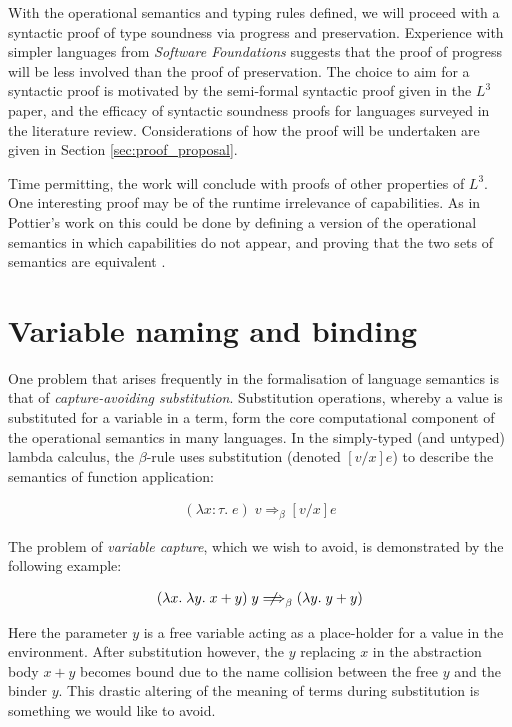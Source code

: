 \documentclass[]{unswthesis}
\newcommand{\SSPHS}{\text{SSPHS }}
\begin{document}
With the operational semantics and typing rules defined, we will proceed with a syntactic proof of type soundness via progress and preservation. Experience with simpler languages from \textit{Software Foundations} \cite{pierce15} suggests that the proof of progress will be less involved than the proof of preservation. The choice to aim for a syntactic proof is motivated by the semi-formal syntactic proof given in the $L^3$ paper, and the efficacy of syntactic soundness proofs for languages surveyed in the literature review. Considerations of how the proof will be undertaken are given in Section \ref{sec:proof_proposal}.

Time permitting, the work will conclude with proofs of other properties of $L^3$. One interesting proof may be of the runtime irrelevance of capabilities. As in Pottier's work on \SSPHS this could be done by defining a version of the operational semantics in which capabilities do not appear, and proving that the two sets of semantics are equivalent \cite{pottier13}.

\section{Variable naming and binding}
\label{sec:var_naming}

One problem that arises frequently in the formalisation of language semantics is that of \textit{capture-avoiding substitution}. Substitution operations, whereby a value is substituted for a variable in a term, form the core computational component of the operational semantics in many languages. In the simply-typed (and untyped) lambda calculus, the $\beta$-rule uses substitution (denoted $[v/x]e$) to describe the semantics of function application:

\begin{eqnarray*}
(\lambda x : \tau. \; e) \; v \Longrightarrow_\beta [v/x]e
\end{eqnarray*}

The problem of \textit{variable capture}, which we wish to avoid, is demonstrated by the following example:

\begin{eqnarray*}
(\lambda x. \; \lambda y. \; x + y) \; y \; {\centernot\Longrightarrow}_\beta \; (\lambda y. \; y + y)
\end{eqnarray*}

Here the parameter $y$ is a free variable acting as a place-holder for a value in the environment. After substitution however, the $y$ replacing $x$ in the abstraction body $x + y$ becomes bound due to the name collision between the free $y$ and the binder $y$. This drastic altering of the meaning of terms during substitution is something we would like to avoid.
\end{document}

